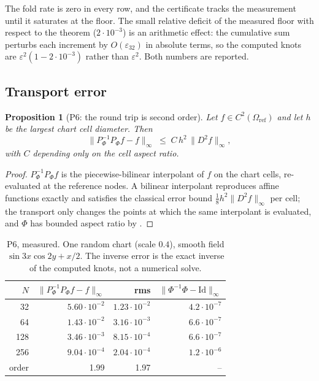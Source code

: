 \documentclass[11pt,a4paper]{article}
\theoremstyle{plain}
\newtheorem{proposition}[theorem]{Proposition}
\theoremstyle{definition}
\newcommand{\Id}{\mathrm{Id}}
\newcommand{\Om}{\Omega_{\mathrm{ref}}}
\newcommand{\Pa}{P_{\Phi}}
\begin{document}
The fold rate is zero in every row, and the certificate tracks the measurement
until it saturates at the floor.  The small relative deficit of the measured
floor with respect to the theorem ($2\cdot10^{-3}$) is an arithmetic effect: the
cumulative sum perturbs each increment by $O(\varepsilon_{32})$ in absolute
terms, so the computed knots are $\varepsilon^2(1-2\cdot10^{-3})$ rather than
$\varepsilon^2$.  Both numbers are reported.

\subsection{Transport error}

\begin{proposition}[P6: the round trip is second order]
\label{prop:roundtrip}
Let $f\in C^2(\Om)$ and let $h$ be the largest chart cell diameter.  Then
\begin{equation}
  \big\|\Pa^{-1}\Pa f-f\big\|_{\infty}\;\le\;C\,h^{2}\,\|D^{2}f\|_{\infty},
\end{equation}
with $C$ depending only on the cell aspect ratio.
\end{proposition}

\begin{proof}
$\Pa^{-1}\Pa f$ is the piecewise-bilinear interpolant of $f$ on the chart cells,
re-evaluated at the reference nodes.  A bilinear interpolant reproduces affine
functions exactly and satisfies the classical error bound
$\tfrac18 h^2\|D^2f\|_\infty$ per cell; the transport only changes the points at
which the same interpolant is evaluated, and $\Phi$ has bounded aspect ratio by
.
\end{proof}

\begin{table}[t]
\centering
\caption{P6, measured.  One random chart (scale $0.4$), smooth field
$\sin3x\cos2y+x/2$.  The inverse error is the exact inverse of the computed
knots, not a numerical solve.}
\label{tab:roundtrip}
\begin{tabular}{rrrr}
\toprule
$N$ & $\|\Pa^{-1}\Pa f-f\|_\infty$ & rms & $\|\Phi^{-1}\Phi-\Id\|_\infty$ \\
\midrule
32  & $5.60\cdot10^{-2}$ & $1.23\cdot10^{-2}$ & $4.2\cdot10^{-7}$\\
64  & $1.43\cdot10^{-2}$ & $3.16\cdot10^{-3}$ & $6.6\cdot10^{-7}$\\
128 & $3.46\cdot10^{-3}$ & $8.15\cdot10^{-4}$ & $6.6\cdot10^{-7}$\\
256 & $9.04\cdot10^{-4}$ & $2.04\cdot10^{-4}$ & $1.2\cdot10^{-6}$\\
\midrule
order & 1.99 & 1.97 & --\\
\bottomrule
\end{tabular}
\end{table}
\end{document}
